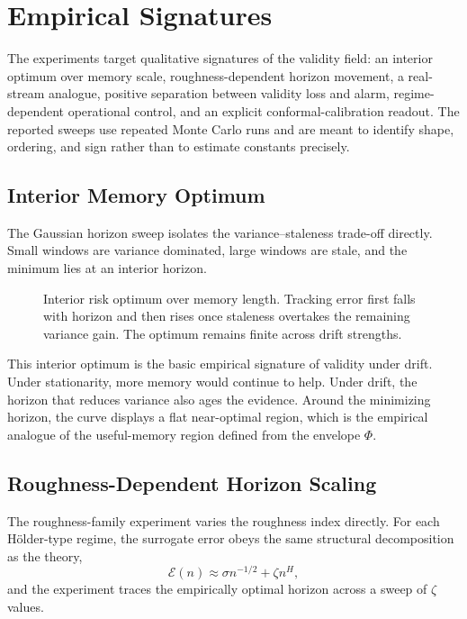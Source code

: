 \section{Empirical Signatures}\label{sec:empirical_signatures}

The experiments target qualitative signatures of the validity field:
an interior optimum over memory scale, roughness-dependent horizon movement, a
real-stream analogue, positive separation between validity loss and alarm,
regime-dependent operational control, and an explicit conformal-calibration
readout. The reported sweeps use repeated Monte Carlo runs and are meant to
identify shape, ordering, and sign rather than to estimate constants precisely.

\subsection{Interior Memory Optimum}\label{sec:empirical_memory_optimum}

The Gaussian horizon sweep isolates the variance--staleness trade-off directly.
Small windows are variance dominated, large windows are stale, and the minimum
lies at an interior horizon.

\begin{figure}[!htbp]
\centering
{}
\caption{Interior risk optimum over memory length. Tracking error first falls
with horizon and then rises once staleness overtakes the remaining variance
gain. The optimum remains finite across drift strengths.}
\label{fig:memory_optimum}
\end{figure}

This interior optimum is the basic empirical signature of validity under drift.
Under stationarity, more memory would continue to help. Under drift, the horizon
that reduces variance also ages the evidence. Around the minimizing horizon,
the curve displays a flat near-optimal region, which is the empirical analogue
of the useful-memory region defined from the envelope $\Phi$.

\subsection{Roughness-Dependent Horizon Scaling}
\label{sec:empirical_roughness_scaling}

The roughness-family experiment varies the roughness index directly. For each
H\"older-type regime, the surrogate error obeys the same structural
decomposition as the theory,
\[
  \mathcal E(n) \approx \sigma n^{-1/2} + \zeta n^H,
\]
and the experiment traces the empirically optimal horizon across a sweep of
$\zeta$ values.

